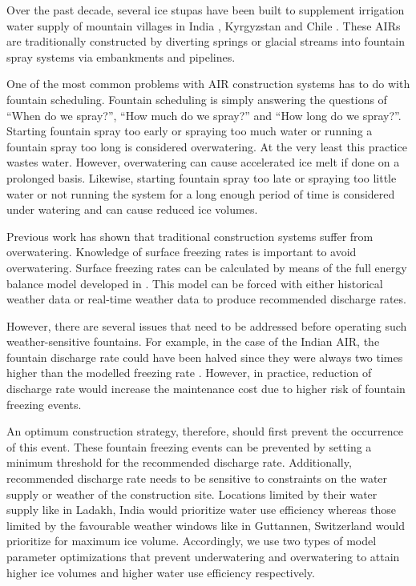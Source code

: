 \documentclass[tc, manuscript]{copernicus}
\begin{document}
Over the past decade, several ice stupas have been built to supplement irrigation water supply of mountain
villages in India \citep{wangchukIceStupaCompetition2020, palmerStoringFrozenWater2022,
aggarwalAdaptationClimateChange2021}, Kyrgyzstan \citep{bbcnewsBrightArtificialGlacier2020} and Chile
\citep{reutersConservationistsChileAim2021}. These AIRs are traditionally constructed by diverting springs or
glacial streams into fountain spray systems via embankments and pipelines. 

One of the most common problems with AIR construction systems has to do with fountain scheduling. Fountain
scheduling is simply answering the questions of “When do we spray?”, “How much do we spray?” and “How long do we
spray?”. Starting fountain spray too early or spraying too much water or running a fountain spray too long is
considered overwatering. At the very least this practice wastes water. However, overwatering can cause
accelerated ice melt if done on a prolonged basis. Likewise, starting fountain spray too late or spraying too
little water or not running the system for a long enough period of time is considered under watering and can
cause reduced ice volumes.

Previous work \citep{balasubramanianInfluenceMeteorologicalConditions2022} has shown that traditional
construction systems suffer from overwatering. Knowledge of surface freezing rates is important to
avoid overwatering. Surface freezing rates can be calculated by means of the full energy balance model
developed in \cite{balasubramanianInfluenceMeteorologicalConditions2022}. This model can be forced with either
historical weather data or real-time weather data to produce recommended discharge rates.

However, there are several issues that need to be addressed before operating such weather-sensitive fountains.
For example, in the case of the Indian AIR, the fountain discharge rate could have been halved since they were
always two times higher than the modelled freezing rate
\citep{balasubramanianInfluenceMeteorologicalConditions2022}. However, in practice, reduction of discharge rate
would increase the maintenance cost due to higher risk of fountain freezing events.

An optimum construction strategy, therefore, should first prevent the occurrence of this event. These fountain
freezing events can be prevented by setting a minimum threshold for the recommended discharge rate.
Additionally, recommended discharge rate needs to be sensitive to constraints on the water supply or weather of
the construction site. Locations limited by their water supply like in Ladakh, India would prioritize water use
efficiency whereas those limited by the favourable weather windows like in Guttannen, Switzerland  would
prioritize for maximum ice volume.  Accordingly, we use two types of model parameter optimizations that prevent
underwatering and overwatering to attain higher ice volumes and higher water use efficiency respectively.
\end{document}
